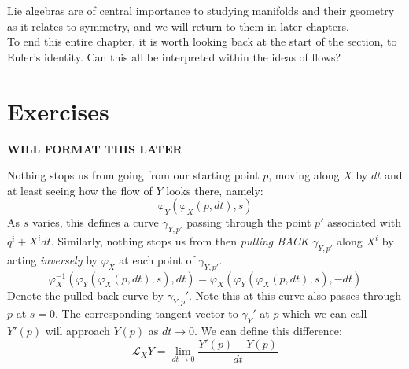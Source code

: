 		Lie algebras are of central importance to studying manifolds and their geometry as it relates to symmetry, and we will return to them in later chapters. \\
		
		To end this entire chapter, it is worth looking back at the start of the section, to Euler's identity. Can this all be interpreted within the ideas of flows? 
		
		
		
		
	
	\section{Exercises}

	\textbf{WILL FORMAT THIS LATER}


Nothing stops us from going from our starting point $p$, moving along $X$ by $dt$ and at least seeing how the flow of $Y$ looks there, namely:
	\begin{equation}
		\varphi_{Y} (\varphi_{X}(p, dt), s)
	\end{equation}
	As $s$ varies, this defines a curve $\gamma_{Y,p'}$ passing through the point $p'$ associated with $q^i + X^i dt$. Similarly, nothing stops us from then \emph{pulling BACK} $\gamma_{Y,p'}$ along $X^i$ by acting \emph{inversely} by $\varphi_X$ at each point of $\gamma_{Y,p'}$.
	\begin{equation}
		\varphi^{-1}_X (\varphi_Y (\varphi_X(p, dt), s), dt)
		 = \varphi_X (\varphi_Y(\varphi_X(p, dt), s), -dt)
	\end{equation}
	Denote the pulled back curve by $\gamma_{Y,p}'$. Note this at this curve also passes through $p$ at $s=0$. The corresponding tangent vector to $\gamma_Y'$ at $p$ which we can call $Y'(p)$ will approach $Y(p)$ as $dt \rightarrow 0$. We can define this difference:
	\begin{equation}
		\mathcal L_X Y = \lim_{dt \rightarrow 0} \frac{Y'(p) - Y(p)}{dt}
	\end{equation}

